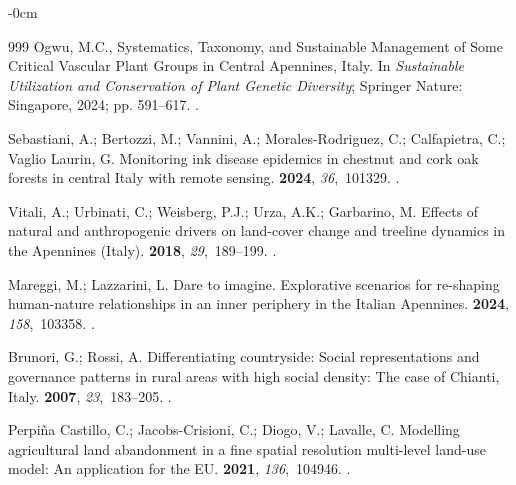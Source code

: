 \documentclass[jimaging,article,accept,pdftex,oneauthor]{Definitions/mdpi}
\begin{document}
\begin{adjustwidth}{-\extralength}{0cm}
\begin{thebibliography}{999}
Ogwu, M.C., Systematics, Taxonomy, and Sustainable Management of Some Critical
  Vascular Plant Groups in Central Apennines, Italy.
\newblock In {\em Sustainable Utilization and Conservation of Plant Genetic
  Diversity}; Springer Nature: Singapore,  2024; pp. 591--617.
.

Sebastiani, A.; Bertozzi, M.; Vannini, A.; Morales-Rodriguez, C.; Calfapietra,
  C.; {Vaglio Laurin}, G.
\newblock Monitoring ink disease epidemics in chestnut and cork oak forests in
  central Italy with remote sensing.
 {\bf
  2024}, {\em 36},~101329.
.

Vitali, A.; Urbinati, C.; Weisberg, P.J.; Urza, A.K.; Garbarino, M.
\newblock Effects of natural and anthropogenic drivers on land-cover change and
  treeline dynamics in the Apennines (Italy).
 {\bf 2018}, {\em 29},~189--199.
.

Mareggi, M.; Lazzarini, L.
\newblock Dare to imagine. Explorative scenarios for re-shaping human-nature
  relationships in an inner periphery in the Italian Apennines.
 {\bf 2024}, {\em 158},~103358.
.

Brunori, G.; Rossi, A.
\newblock Differentiating countryside: Social representations and governance
  patterns in rural areas with high social density: The case of Chianti, Italy.
 {\bf 2007}, {\em 23},~183--205.
.

{Perpiña Castillo}, C.; Jacobs-Crisioni, C.; Diogo, V.; Lavalle, C.
\newblock Modelling agricultural land abandonment in a fine spatial resolution
  multi-level land-use model: An application for the EU.
 {\bf 2021}, {\em
  136},~104946.
.


\end{thebibliography}
\end{adjustwidth}
\end{document}
